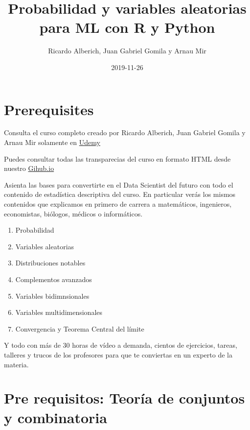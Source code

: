 \documentclass[]{book}
\title{Probabilidad y variables aleatorias para ML con R y Python}
\author{Ricardo Alberich, Juan Gabriel Gomila y Arnau Mir}
\date{2019-11-26}
\providecommand{\tightlist}{%
  \setlength{\itemsep}{0pt}\setlength{\parskip}{0pt}}
\newcommand{\FunCar}{\phi}
\newcommand{\FunGenMom}{m}
\newcommand{\Momk}{M}
\newcommand{\MomCenk}{MC}
\newcommand\momento{m}
\newcommand{\momentocentral}{\mu}
\newcommand{\Entropia}{H}
\begin{document}
\maketitle

{
\setcounter{tocdepth}{1}
\tableofcontents
}
\newcommand{\FunCar}{\phi}
\newcommand{\FunGenMom}{m}
\newcommand{\Momk}{M}
\newcommand{\MomCenk}{MC}
\newcommand\momento{m}
\newcommand{\momentocentral}{\mu}
\newcommand{\Entropia}{H}

\hypertarget{prerequisites}{%
\chapter*{Prerequisites}\label{prerequisites}}

Consulta el curso completo creado por Ricardo Alberich, Juan Gabriel Gomila y Arnau Mir solamente en \href{https://www.udemy.com/course/probabilidad-y-variables-aleatorias-para-ml-con-r-y-python/?couponCode=B85F8D52148DF5AAD8F7}{Udemy}

Puedes consultar todas las transparecias del curso en formato HTML desde nuestro \href{https://joanby.github.io/probabilidad/}{Gihub.io}

Asienta las bases para convertirte en el Data Scientist del futuro con todo el contenido de estadística descriptiva del curso. En particular verás los mismos contenidos que explicamos en primero de carrera a matemáticos, ingenieros, economistas, biólogos, médicos o informáticos.

\begin{enumerate}
\def\labelenumi{\arabic{enumi}.}
\tightlist
\item
  Probabilidad
\item
  Variables aleatorias
\item
  Distribuciones notables
\item
  Complementos avanzados
\item
  Variables bidimnsionales
\item
  Variables multidimensionales
\item
  Convergencia y Teorema Central del límite
\end{enumerate}

Y todo con más de 30 horas de vídeo a demanda, cientos de ejercicios, tareas, talleres y trucos de los profesores para que te conviertas en un experto de la materia.

\hypertarget{pre-requisitos-teoruxeda-de-conjuntos-y-combinatoria}{%
\chapter*{Pre requisitos: Teoría de conjuntos y combinatoria}\label{pre-requisitos-teoruxeda-de-conjuntos-y-combinatoria}}
\end{document}
